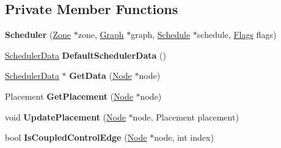 \subsection*{Private Member Functions}
\begin{DoxyCompactItemize}
\item 
{\bfseries Scheduler} (\hyperlink{classv8_1_1internal_1_1_zone}{Zone} $\ast$zone, \hyperlink{classv8_1_1internal_1_1compiler_1_1_graph}{Graph} $\ast$graph, \hyperlink{classv8_1_1internal_1_1compiler_1_1_schedule}{Schedule} $\ast$schedule, \hyperlink{classv8_1_1base_1_1_flags}{Flags} flags)\hypertarget{classv8_1_1internal_1_1compiler_1_1_scheduler_ae7150a93bd7d30083400ecfdfa2156b6}{}\label{classv8_1_1internal_1_1compiler_1_1_scheduler_ae7150a93bd7d30083400ecfdfa2156b6}

\item 
\hyperlink{structv8_1_1internal_1_1compiler_1_1_scheduler_1_1_scheduler_data}{Scheduler\+Data} {\bfseries Default\+Scheduler\+Data} ()\hypertarget{classv8_1_1internal_1_1compiler_1_1_scheduler_ab785aaee578456308cd97c489ba4f74d}{}\label{classv8_1_1internal_1_1compiler_1_1_scheduler_ab785aaee578456308cd97c489ba4f74d}

\item 
\hyperlink{structv8_1_1internal_1_1compiler_1_1_scheduler_1_1_scheduler_data}{Scheduler\+Data} $\ast$ {\bfseries Get\+Data} (\hyperlink{classv8_1_1internal_1_1compiler_1_1_node}{Node} $\ast$node)\hypertarget{classv8_1_1internal_1_1compiler_1_1_scheduler_a30c790168cd416d0eea46332db06d000}{}\label{classv8_1_1internal_1_1compiler_1_1_scheduler_a30c790168cd416d0eea46332db06d000}

\item 
Placement {\bfseries Get\+Placement} (\hyperlink{classv8_1_1internal_1_1compiler_1_1_node}{Node} $\ast$node)\hypertarget{classv8_1_1internal_1_1compiler_1_1_scheduler_ab5df635f6a7eb61f08aadaaeb57f3119}{}\label{classv8_1_1internal_1_1compiler_1_1_scheduler_ab5df635f6a7eb61f08aadaaeb57f3119}

\item 
void {\bfseries Update\+Placement} (\hyperlink{classv8_1_1internal_1_1compiler_1_1_node}{Node} $\ast$node, Placement placement)\hypertarget{classv8_1_1internal_1_1compiler_1_1_scheduler_a2c6b9f21d895554989320bae1e5e4cf8}{}\label{classv8_1_1internal_1_1compiler_1_1_scheduler_a2c6b9f21d895554989320bae1e5e4cf8}

\item 
bool {\bfseries Is\+Coupled\+Control\+Edge} (\hyperlink{classv8_1_1internal_1_1compiler_1_1_node}{Node} $\ast$node, int index)\hypertarget{classv8_1_1internal_1_1compiler_1_1_scheduler_a9819e1fdee70ec2833c66df9636d3d12}{}\label{classv8_1_1internal_1_1compiler_1_1_scheduler_a9819e1fdee70ec2833c66df9636d3d12}


\end{DoxyCompactItemize}
